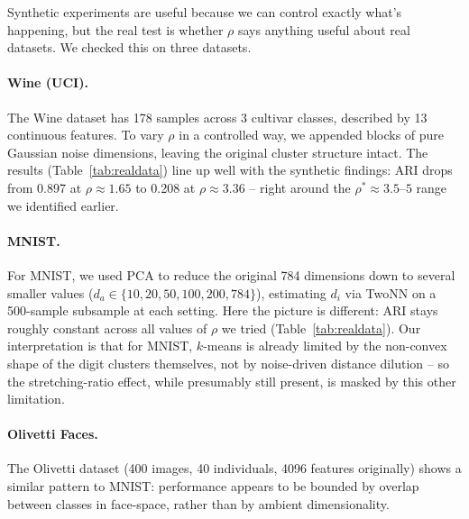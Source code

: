 \documentclass[pdflatex,sn-mathphys-num]{sn-jnl}
\theoremstyle{thmstyleone}
\begin{document}
Synthetic experiments are useful because we can control exactly what's
happening, but the real test is whether $\rho$ says anything useful about real
datasets. We checked this on three datasets.

\paragraph{Wine (UCI).}
The Wine dataset has 178 samples across 3 cultivar classes, described by 13
continuous features. To vary $\rho$ in a controlled way, we appended blocks of
pure Gaussian noise dimensions, leaving the original cluster structure intact.
The results (Table~\ref{tab:realdata}) line up well with the synthetic
findings: ARI drops from 0.897 at $\rho \approx 1.65$ to 0.208 at
$\rho \approx 3.36$ -- right around the $\rho^* \approx 3.5$--$5$ range we
identified earlier.

\paragraph{MNIST.}
For MNIST, we used PCA to reduce the original 784 dimensions down to several
smaller values ($d_a \in \{10, 20, 50, 100, 200, 784\}$), estimating $d_i$ via
TwoNN on a 500-sample subsample at each setting. Here the picture is different:
ARI stays roughly constant across all values of $\rho$ we tried
(Table~\ref{tab:realdata}). Our interpretation is that for MNIST, $k$-means is
already limited by the non-convex shape of the digit clusters themselves, not
by noise-driven distance dilution -- so the stretching-ratio effect, while
presumably still present, is masked by this other limitation.

\paragraph{Olivetti Faces.}
The Olivetti dataset (400 images, 40 individuals, 4096 features originally)
shows a similar pattern to MNIST: performance appears to be bounded by overlap
between classes in face-space, rather than by ambient dimensionality.
\end{document}
